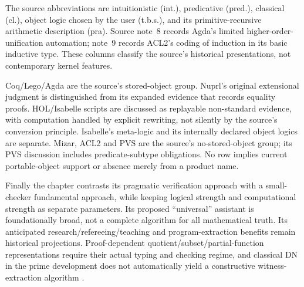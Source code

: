 The source abbreviations are intuitionistic (int.), predicative (pred.),
classical (cl.), object logic chosen by the user (t.b.s.), and its
primitive-recursive arithmetic description (pra). Source note~8 records
Agda's limited higher-order-unification automation; note~9 records ACL2's
coding of induction in its basic inductive type. These columns classify
the source's historical presentations, not contemporary kernel features.

Coq/Lego/Agda are the source's stored-object group. Nuprl's original
extensional judgment is distinguished from its expanded evidence that
records equality proofs. HOL/Isabelle scripts are discussed as replayable
non-standard evidence, with computation handled by explicit rewriting,
not silently by the source's conversion principle. Isabelle's meta-logic
and its internally declared object logics are separate. Mizar, ACL2 and
PVS are the source's no-stored-object group; its PVS discussion includes
predicate-subtype obligations. No row implies current portable-object
support or absence merely from a product name.

Finally the chapter contrasts its pragmatic verification approach with a
small-checker fundamental approach, while keeping logical strength and
computational strength as separate parameters. Its proposed ``universal''
assistant is foundationally broad, not a complete algorithm for all
mathematical truth. Its anticipated research/refereeing/teaching and
program-extraction benefits remain historical projections. Proof-dependent
quotient/subset/partial-function representations require their actual
typing and checking regime, and classical DN in the prime development
does not automatically yield a constructive witness-extraction algorithm
\cite[pp.~1228--1230]{BarendregtGeuvers2001}.

